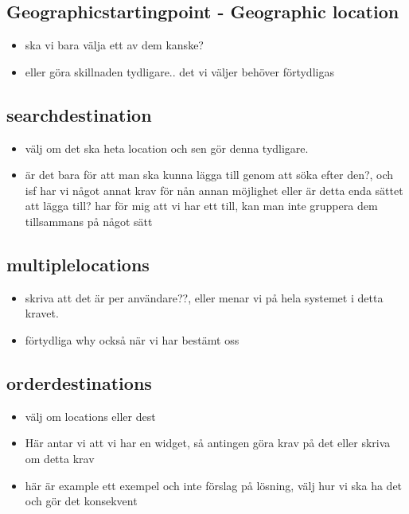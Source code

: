 \documentclass[a4paper]{article}
\begin{document}
	\subsection{Geographicstartingpoint - Geographic location}
		\begin{itemize}
			\item ska vi bara välja ett av dem kanske?
			\item eller göra skillnaden tydligare.. det vi väljer behöver förtydligas
		\end{itemize}

	\subsection{searchdestination}
		\begin{itemize}
			\item välj om det ska heta location och sen gör denna tydligare. 
			\item är det bara för att man ska kunna lägga till genom att söka efter den?, och isf har vi något annat krav för nån annan möjlighet eller är detta enda sättet att lägga till? har för mig att vi har ett till, kan man inte gruppera dem tillsammans på något sätt
		\end{itemize}
		
	\subsection{multiplelocations}
		\begin{itemize}
			\item skriva att det är per användare??, eller menar vi på hela systemet i detta kravet. 
			\item förtydliga why också när vi har bestämt oss
		\end{itemize}
		
		
	\subsection{orderdestinations}
		\begin{itemize}
			\item välj om locations eller dest
			\item Här antar vi att vi har en widget, så antingen göra krav på det eller skriva om detta krav
			\item här är example ett exempel och inte förslag på lösning, välj hur vi ska ha det och gör det konsekvent
 		
		\end{itemize}
		
\end{document}
